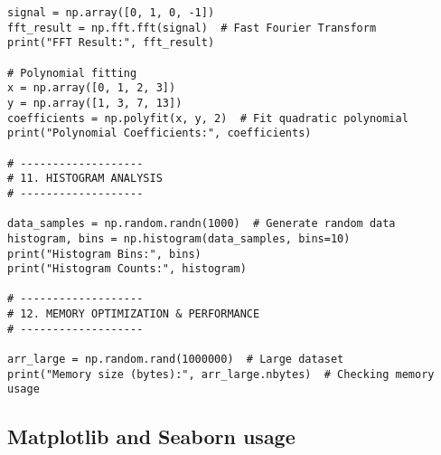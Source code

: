 \begin{verbatim}
signal = np.array([0, 1, 0, -1])
fft_result = np.fft.fft(signal)  # Fast Fourier Transform
print("FFT Result:", fft_result)

# Polynomial fitting
x = np.array([0, 1, 2, 3])
y = np.array([1, 3, 7, 13])
coefficients = np.polyfit(x, y, 2)  # Fit quadratic polynomial
print("Polynomial Coefficients:", coefficients)

# -------------------
# 11. HISTOGRAM ANALYSIS
# -------------------

data_samples = np.random.randn(1000)  # Generate random data
histogram, bins = np.histogram(data_samples, bins=10)
print("Histogram Bins:", bins)
print("Histogram Counts:", histogram)

# -------------------
# 12. MEMORY OPTIMIZATION & PERFORMANCE
# -------------------

arr_large = np.random.rand(1000000)  # Large dataset
print("Memory size (bytes):", arr_large.nbytes)  # Checking memory usage
\end{verbatim}

\subsection{Matplotlib and Seaborn usage}

